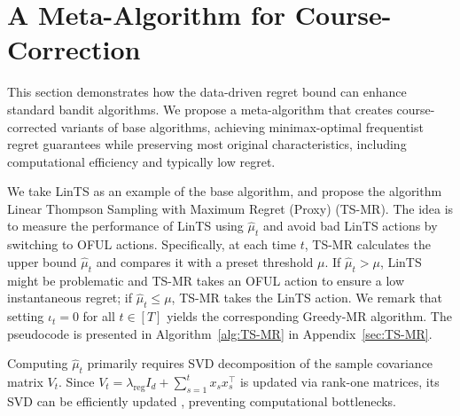 





\section{A Meta-Algorithm for Course-Correction}
\label{sec:meta}


This section demonstrates how the data-driven regret bound can enhance standard bandit algorithms. We propose a meta-algorithm that creates course-corrected variants of base algorithms, achieving minimax-optimal frequentist regret guarantees while preserving most original characteristics, including computational efficiency and typically low regret.


We take LinTS as an example of the base algorithm, and propose the algorithm Linear Thompson Sampling with Maximum Regret (Proxy) (TS-MR). The idea is to measure the performance of LinTS using $\hat{\mu}_t$ and avoid bad LinTS actions by switching to OFUL actions. Specifically, at each time $t$, TS-MR calculates the upper bound $\hat{\mu}_t$ and compares it with a preset threshold $\mu$. If  $\hat{\mu}_t > \mu$, LinTS might be problematic and  TS-MR takes an OFUL action to ensure a low instantaneous regret; if $\hat{\mu}_t\leq \mu$, TS-MR  takes the LinTS action. We remark that setting $\iota_t = 0$ for all $t\in [T]$ yields the corresponding Greedy-MR algorithm. The pseudocode is presented in Algorithm~\ref{alg:TS-MR} in Appendix~\ref{sec:TS-MR}. 

\begin{remark}
Computing $\hat{\mu}_t$ primarily requires SVD decomposition of the sample covariance matrix $V_t$. Since $V_t=\lambda_{\text{reg}} I_d+\sum_{s=1}^t x_s x_s^{\top}$ is updated via rank-one matrices, its SVD can be efficiently updated \citep{gandhi2017updating}, preventing computational bottlenecks.
\end{remark}


